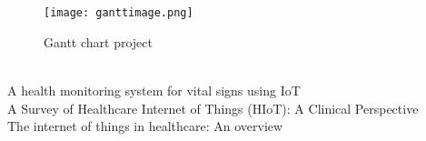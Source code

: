 \documentclass[paper=a4, fontsize=11pt]{scrartcl}
\numberwithin{equation}{section}		%
\numberwithin{figure}{section}			%
\numberwithin{table}{section}				%
\begin{document}
\chapter{}
    \begin{figure}
        \centering
        \texttt{[image: ganttimage.png]}
        \caption{Gantt chart project }
        \label{fig: Gantt chart of the project }
    \end{figure}
    
\pagebreak

\maketitle
 \\
 A health monitoring system for vital signs using IoT \cite{SWAROOP2019116}
\\
A Survey of Healthcare Internet of Things (HIoT): A Clinical Perspective \cite{8863483}
\\
 The internet of things in healthcare: An overview \cite{YIN20163}
 \\
 



\end{document}
